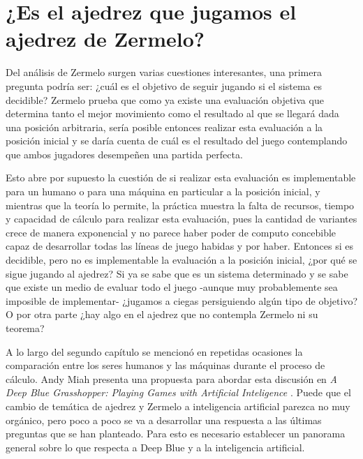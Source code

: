 \documentclass[twoside,openright,12pt,a4paper,spanish]{book}
\begin{document}
\section{¿Es el ajedrez que jugamos el ajedrez de Zermelo?}

\noindent  Del análisis de Zermelo surgen varias cuestiones interesantes, una primera pregunta podría ser: ¿cuál es el objetivo de seguir jugando si el sistema es decidible? Zermelo prueba que como ya existe una evaluación objetiva que determina tanto el mejor movimiento como el resultado al que se llegará dada una posición arbitraria, sería posible entonces realizar esta evaluación a la posición inicial y se daría cuenta de cuál es el resultado del juego contemplando que ambos jugadores desempeñen una partida perfecta. 

Esto abre por supuesto la cuestión de si realizar esta evaluación es implementable para un humano o para una máquina en particular a la posición inicial, y mientras que la teoría lo permite, la práctica muestra la falta de recursos, tiempo y capacidad de cálculo para realizar esta evaluación, pues la cantidad de variantes crece de manera exponencial y no parece haber poder de computo concebible capaz de desarrollar todas las líneas de juego habidas y por haber. Entonces si es decidible, pero no es implementable la evaluación a la posición inicial, ¿por qué se sigue jugando al ajedrez? Si ya se sabe que es un sistema determinado y se sabe que existe un medio de evaluar todo el juego -aunque muy probablemente sea imposible  de implementar- ¿jugamos a ciegas persiguiendo algún tipo de objetivo? O por otra parte ¿hay algo en el ajedrez que no contempla Zermelo ni su teorema? 

A lo largo del segundo capítulo se mencion\'o en repetidas ocasiones la comparaci\'on entre los seres humanos y las m\'aquinas durante el proceso de c\'alculo. Andy Miah presenta una propuesta para abordar esta discusión en \emph{A Deep Blue Grasshopper: Playing Games with Artificial Inteligence} \cite{miah2008deep}. Puede que el cambio de temática de ajedrez y Zermelo a inteligencia artificial parezca no muy orgánico, pero poco a poco se va a desarrollar una respuesta a las últimas preguntas que se han planteado. Para esto es necesario establecer un panorama general sobre lo que respecta a Deep Blue y a la inteligencia artificial. 
\end{document}
